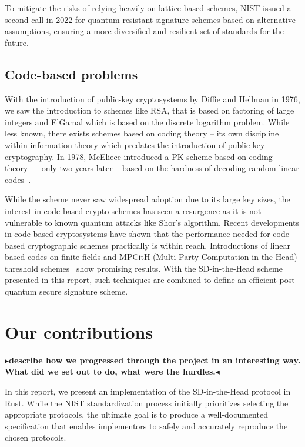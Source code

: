 \documentclass[11pt]{report}
\theoremstyle{definition}
\theoremstyle{plain}
\newcommand{\todo}[1]{{\color[rgb]{.5,0,0}\textbf{$\blacktriangleright$#1$\blacktriangleleft$}}}
\begin{document}
To mitigate the risks of relying heavily on lattice-based schemes, NIST issued a second call in 2022 for quantum-resistant signature schemes based on alternative assumptions, ensuring a more diversified and resilient set of standards for the future.


\subsection{Code-based problems}

With the introduction of public-key cryptosystems by Diffie and Hellman in 1976, we saw the introduction to schemes like RSA, that is based on factoring of large integers and ElGamal which is based on the discrete logarithm problem. While less known, there exists schemes based on coding theory -- its own discipline within information theory which predates the introduction of public-key cryptography. In 1978, McEliece introduced a PK scheme based on coding theory~\cite{mceliece1978public} -- only two years later -- based on the hardness of decoding random linear codes~\cite{berlekamp1978inherent}.

While the scheme never saw widespread adoption due to its large key sizes, the interest in code-based crypto-schemes has seen a resurgence as it is not vulnerable to known quantum attacks like Shor's algorithm. Recent developments in code-based cryptosystems have shown that the performance needed for code based cryptographic schemes practically is within reach. Introductions of linear based codes on finite fields and MPCitH (Multi-Party Computation in the Head) threshold schemes~\cite{baum2020concretely} show promising results. With the SD-in-the-Head scheme~\cite{aguilarsyndrome11,feneuil2023threshold} presented in this report, such techniques are combined to define an efficient post-quantum secure signature scheme.

\section{Our contributions}

\todo{describe how we progressed through the project in an interesting way. What did we set out to do, what were the hurdles.}

In this report, we present an implementation of the SD-in-the-Head protocol in Rust. While the NIST standardization process initially prioritizes selecting the appropriate protocols, the ultimate goal is to produce a well-documented specification that enables implementors to safely and accurately reproduce the chosen protocols.
\end{document}
